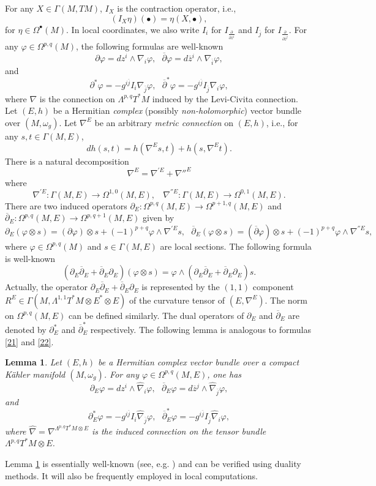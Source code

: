 \documentclass[12pt, reqno]{amsart}
\newcommand\bp{{\bar\partial}}
\theoremstyle{plain}
\newtheorem{lemma}[thm]{Lemma}
\theoremstyle{definition}
\newcommand{\elemma}{\end{lemma}}
\newcommand{\blemma}{\begin{lemma}}
\newcommand{\p}{\partial}
\renewcommand{\bar}{\overline}
\renewcommand{\phi}{\varphi}
\newcommand{\beq}{\begin{equation}}
\newcommand{\eeq}{\end{equation}}
\renewcommand{\hat}{\widehat}
\renewcommand{\bp}{\bar{\partial}}
\newcommand{\Om}{\Omega}
\newcommand{\ts}{\otimes}
\renewcommand{\>}{\rightarrow}
\renewcommand{\#}{\sharp}
\numberwithin{equation}{section} %
\begin{document}
\noindent
 For any  $X\in \Gamma(M,TM)$, $I_X$ is the contraction operator, i.e., \beq (I_X\eta)(\bullet)=\eta(X,\bullet), \eeq
for $\eta\in\Om^\bullet(M)$. In local  coordinates,
we also write $I_{i}$ for $I_{\frac{\p}{\p z^i}}$ and $I_{\bar j}$ for $I_{\frac{\p}{\p \bar z^j}}$. For any  $\phi \in \Omega^{p,q}(M)$, the following formulas are well-known
\beq \p \phi=dz^i \wedge \nabla_i \phi, \ \ \  \bp \phi=d\bar z{}^i \wedge \nabla_{\bar i}\phi, \label{21} \eeq
and
\beq \p^* \phi= -g^{i\bar j}I_i\nabla_{\bar j}\phi, \ \ \  \bp^* \phi = -g^{i\bar j}I_{\bar j}\nabla_i \phi, \label{22}\eeq
where $\nabla $ is the  connection on $ \Lambda^{p,q}T^*M $ induced by the Levi-Civita connection. \\


Let $(E,h)$ be a Hermitian
\emph{complex} (possibly \emph{non-holomorphic}) vector bundle over $(M,\omega_g)$. Let $\nabla^E$ be an arbitrary \emph{metric
    connection} on $(E,h)$, i.e.,   for any $s,t\in \Gamma(M,E)$, \beq dh(s,t)=h(\nabla^E s, t)+h(s,
\nabla^E t). \eeq There is a natural
decomposition \beq \nabla^E=\nabla^{'E}+\nabla{''^E} \eeq where
\beq
\nabla^{'E}:\Gamma(M,E)\>\Om^{1,0}(M,E),\ \ \ \
\nabla^{''E}:\Gamma(M,E)\>\Om^{0,1}(M,E).
\eeq
There are two induced operators
$
\p_E:\Om^{p,q}(M,E)\>\Om^{p+1,q}(M,E)$ and $\bp_E:\Om^{p,q}(M,E)\>\Om^{p,q+1}(M,E) $ given by \beq
\p_E(\phi\ts s)=\left(\p\phi\right)\ts s+(-1)^{p+q}\phi\wedge
\nabla^{'E}s,\ \ \
\bp_E(\phi\ts s)=\left(\bp\phi\right)\ts s+(-1)^{p+q}\phi\wedge
\nabla^{''E}s, \eeq where $\phi\in \Om^{p,q}(M)$ and $s\in
\Gamma(M,E)$ are local sections. The following formula is well-known \beq
\left(\p_E\bp_E+\bp_E\p_E\right)(\phi\ts s)=\phi\wedge
\left(\p_E\bp_E+\bp_E\p_E\right)s.\eeq Actually,  the operator $\p_E\bp_E+\bp_E\p_E$ is
represented by the $(1,1)$  component $R^E \in \Gamma(M,
\Lambda^{1,1}T^*M\ts E^*\ts E)$ of the curvature tensor of $(E,\nabla^E)$. The norm on
$\Om^{p,q}(M,E)$ can be defined similarly. The dual operators of $\p_E$
and $\bp_E$ are denoted by $\p^*_E$ and $\bp_E^*$
respectively. The following lemma is analogous to formulas \eqref{21} and \eqref{22}.

\blemma\label{keylemma} Let $(E,h)$ be a Hermitian complex vector bundle over a compact K\"ahler manifold $(M,\omega_g)$.
For any $\phi \in \Omega^{p,q}(M,E) $, one has
\beq \p_E \phi = dz^i \wedge \hat \nabla_i \phi, \ \ \ \bp_E \phi = d\bar z{}^j \wedge \hat \nabla_{\bar j} \phi, \eeq
and
\beq \p_E^* \phi = - g^{i\bar j} I_i \hat \nabla_{\bar j} \phi, \ \ \ \bp_E^* \phi = -g^{i\bar j} I_{\bar j} \hat \nabla_i \phi, \eeq
where $\hat \nabla = \nabla^{\Lambda^{p,q}T^*M \otimes E}$ is the induced connection on the tensor bundle $ \Lambda^{p,q}T^*M \otimes E $.
\elemma
\noindent Lemma \ref{keylemma} is essentially well-known (see, e.g. \cite[Lemma~8.9]{LY12}) and  can be verified using duality methods. It will also be frequently employed in local computations.
\end{document}
